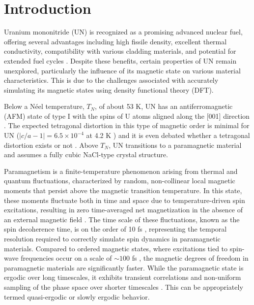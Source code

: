\documentclass[preprint, 12pt]{elsarticle}
\newcommand{\?}{\stackrel{?}{=}}
\begin{document}
\section{Introduction}


Uranium mononitride (UN) is recognized as a promising advanced nuclear fuel, offering several advantages including high fissile density, excellent thermal conductivity, compatibility with various cladding materials, and potential for extended fuel cycles \cite{Wallenius2020, Uno2020}. Despite these benefits, certain properties of UN remain unexplored, particularly the influence of its magnetic state on various material characteristics. This is due to the challenges associated with accurately simulating its magnetic states using density functional theory (DFT).


Below a Néel temperature, $T_N$, of about 53 K, UN has an antiferromagnetic (AFM) state of type I with the spins of U atoms aligned along the [001] direction \cite{Curry1965}. The expected tetragonal distortion in this type of magnetic order is minimal for UN ($|c/a-1| = 6.5 \times 10^{-4}$ at 4.2 K \cite{Samsel2007}) and it is even debated whether a tetragonal distortion exists or not \cite{Samsel2007}. Above $T_N$, UN transitions to a paramagnetic material and assumes a fully cubic NaCl-type crystal structure.

Paramagnetism is a finite-temperature phenomenon arising from thermal and quantum fluctuations, characterized by random, non-collinear local magnetic moments that persist above the magnetic transition temperature. In this state, these moments fluctuate both in time and space due to temperature-driven spin excitations, resulting in zero time-averaged net magnetization in the absence of an external magnetic field \cite{Abrikosov2016}. The time scale of these fluctuations, known as the spin decoherence time, is on the order of 10 fs \cite{Steneteg2012}, representing the temporal resolution required to correctly simulate spin dynamics in paramagnetic materials. Compared to ordered magnetic states, where excitations tied to spin-wave frequencies occur on a scale of $\sim 100$ fs \cite{Abrikosov2016}, the magnetic degrees of freedom in paramagnetic materials are significantly faster. While the paramagnetic state is ergodic over long timescales, it exhibits transient correlations and non-uniform sampling of the phase space over shorter timescales \cite{Gyorffy1985, Abrikosov2016}. This can be appropriately termed quasi-ergodic or slowly ergodic behavior.
\end{document}
